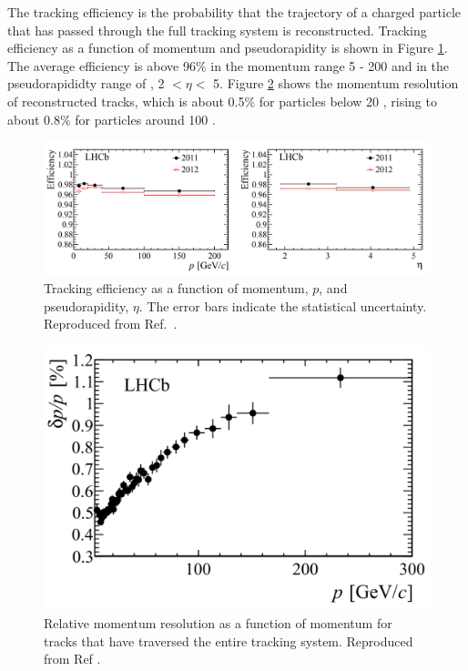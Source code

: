The tracking efficiency is the probability that the trajectory of a charged particle that has passed through the full tracking system is reconstructed. Tracking efficiency as a function of momentum and pseudorapidity is shown in Figure \ref{trackingeff}. The average efficiency is above 96\% in the momentum range 5 - 200 \gevc and in the pseudorapididty range of \lhcb, 2 $< \eta <$ 5. Figure \ref{momentumres} shows the momentum resolution of reconstructed tracks, which is about 0.5\% for particles below 20 \gevc, rising to about 0.8\% for particles around 100 \gevc. 

\begin{figure}
\includegraphics[width=\linewidth]{figures/detector/trackingefficiency.pdf}
\caption{Tracking efficiency as a function of momentum, $p$, and pseudorapidity, $\eta$. The error bars indicate the statistical uncertainty. Reproduced from Ref.~\cite{LHCb-DP-2013-002}.}
\label{trackingeff}
\end{figure}

\begin{figure}
\centering
\includegraphics[width=0.5\linewidth]{figures/detector/momentumresolution.pdf}
\caption{Relative momentum resolution as a function of momentum for tracks that have traversed the entire tracking system. Reproduced from Ref \cite{LHCb-DP-2014-002}.}
\label{momentumres}
\end{figure}
	
